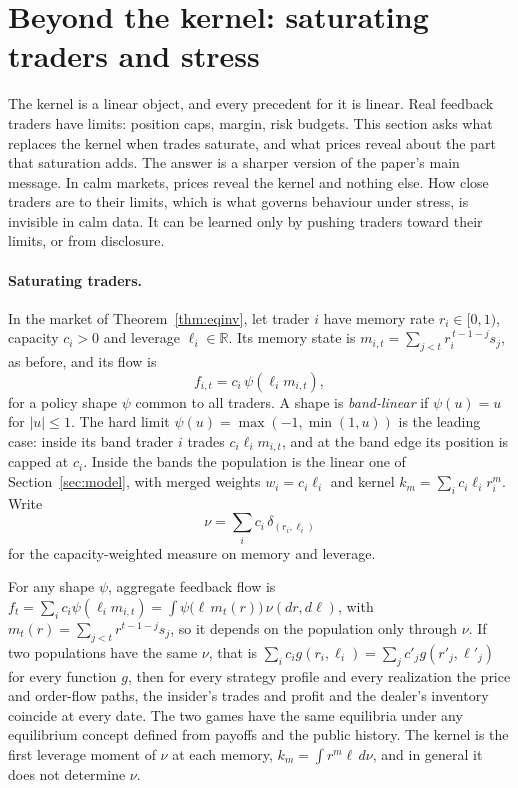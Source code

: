 \section{Beyond the kernel: saturating traders and stress}\label{sec:saturating}

The kernel is a linear object, and every precedent for it is linear. Real feedback traders have limits: position caps, margin, risk budgets. This section asks what replaces the kernel when trades saturate, and what prices reveal about the part that saturation adds. The answer is a sharper version of the paper's main message. In calm markets, prices reveal the kernel and nothing else. How close traders are to their limits, which is what governs behaviour under stress, is invisible in calm data. It can be learned only by pushing traders toward their limits, or from disclosure.

\paragraph{Saturating traders.} In the market of Theorem~\ref{thm:eqinv}, let trader $i$ have memory rate $r_i\in[0,1)$, capacity $c_i>0$ and leverage $\ell_i\in\mathbb R$. Its memory state is $m_{i,t}=\sum_{j<t}r_i^{\,t-1-j}s_j$, as before, and its flow is
\[
 f_{i,t}=c_i\,\psi(\ell_i m_{i,t}),
\]
for a policy shape $\psi$ common to all traders. A shape is \emph{band-linear} if $\psi(u)=u$ for $|u|\le1$. The hard limit $\psi(u)=\max(-1,\min(1,u))$ is the leading case: inside its band trader $i$ trades $c_i\ell_im_{i,t}$, and at the band edge its position is capped at $c_i$. Inside the bands the population is the linear one of Section~\ref{sec:model}, with merged weights $w_i=c_i\ell_i$ and kernel $k_m=\sum_ic_i\ell_ir_i^m$. Write
\[
 \nu=\sum_ic_i\,\delta_{(r_i,\ell_i)}
\]
for the capacity-weighted measure on memory and leverage.

\begin{theorem}\label{thm:satsuff}
For any shape $\psi$, aggregate feedback flow is $f_t=\sum_ic_i\psi(\ell_im_{i,t})=\int\psi\bigl(\ell\,m_t(r)\bigr)\,\nu(dr,d\ell)$, with $m_t(r)=\sum_{j<t}r^{t-1-j}s_j$, so it depends on the population only through $\nu$. If two populations have the same $\nu$, that is $\sum_ic_ig(r_i,\ell_i)=\sum_jc'_jg(r'_j,\ell'_j)$ for every function $g$, then for every strategy profile and every realization the price and order-flow paths, the insider's trades and profit and the dealer's inventory coincide at every date. The two games have the same equilibria under any equilibrium concept defined from payoffs and the public history. The kernel is the first leverage moment of $\nu$ at each memory, $k_m=\int r^m\ell\,d\nu$, and in general it does not determine $\nu$.
\end{theorem}


